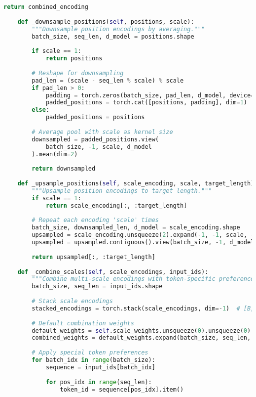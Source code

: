 \begin{lstlisting}[language=Python, caption=Multi-scale position encoding for hierarchical processing]
        return combined_encoding
        
    def _downsample_positions(self, positions, scale):
        """Downsample position encodings by averaging."""
        batch_size, seq_len, d_model = positions.shape
        
        if scale == 1:
            return positions
            
        # Reshape for downsampling
        pad_len = (scale - seq_len % scale) % scale
        if pad_len > 0:
            padding = torch.zeros(batch_size, pad_len, d_model, device=positions.device)
            padded_positions = torch.cat([positions, padding], dim=1)
        else:
            padded_positions = positions
            
        # Average pool with scale as kernel size
        downsampled = padded_positions.view(
            batch_size, -1, scale, d_model
        ).mean(dim=2)
        
        return downsampled
        
    def _upsample_positions(self, scale_encoding, scale, target_length):
        """Upsample position encodings to target length."""
        if scale == 1:
            return scale_encoding[:, :target_length]
            
        # Repeat each encoding 'scale' times
        batch_size, downsampled_len, d_model = scale_encoding.shape
        upsampled = scale_encoding.unsqueeze(2).expand(-1, -1, scale, -1)
        upsampled = upsampled.contiguous().view(batch_size, -1, d_model)
        
        return upsampled[:, :target_length]
        
    def _combine_scales(self, scale_encodings, input_ids):
        """Combine multi-scale encodings with token-specific preferences."""
        batch_size, seq_len = input_ids.shape
        
        # Stack scale encodings
        stacked_encodings = torch.stack(scale_encodings, dim=-1)  # [B, L, D, S]
        
        # Default combination weights
        default_weights = self.scale_weights.unsqueeze(0).unsqueeze(0).unsqueeze(0)
        combined_weights = default_weights.expand(batch_size, seq_len, 1, -1)
        
        # Apply special token preferences
        for batch_idx in range(batch_size):
            sequence = input_ids[batch_idx]
            
            for pos_idx in range(seq_len):
                token_id = sequence[pos_idx].item()
                

\end{lstlisting}
